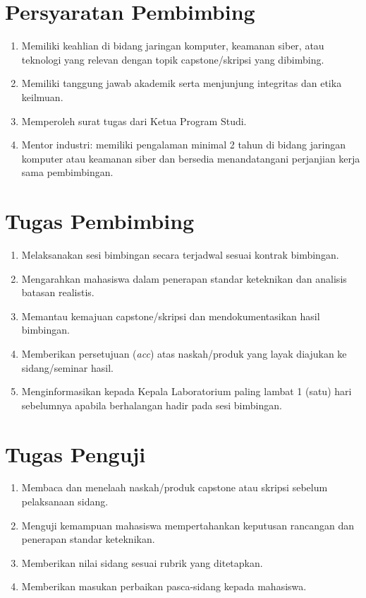 \documentclass[12pt,a4paper]{report}
\begin{document}
\section{Persyaratan Pembimbing}
\begin{enumerate}
\item Memiliki keahlian di bidang jaringan komputer, keamanan siber, atau teknologi yang relevan dengan topik capstone/skripsi yang dibimbing.
\item Memiliki tanggung jawab akademik serta menjunjung integritas dan etika keilmuan.
\item Memperoleh surat tugas dari Ketua Program Studi.
\item Mentor industri: memiliki pengalaman minimal 2 tahun di bidang jaringan komputer atau keamanan siber dan bersedia menandatangani perjanjian kerja sama pembimbingan.
\end{enumerate}

\section{Tugas Pembimbing}
\begin{enumerate}
\item Melaksanakan sesi bimbingan secara terjadwal sesuai kontrak bimbingan.
\item Mengarahkan mahasiswa dalam penerapan standar keteknikan dan analisis batasan realistis.
\item Memantau kemajuan capstone/skripsi dan mendokumentasikan hasil bimbingan.
\item Memberikan persetujuan (\emph{acc}) atas naskah/produk yang layak diajukan ke sidang/seminar hasil.
\item Menginformasikan kepada Kepala Laboratorium paling lambat 1 (satu) hari sebelumnya apabila berhalangan hadir pada sesi bimbingan.
\end{enumerate}

\section{Tugas Penguji}
\begin{enumerate}
\item Membaca dan menelaah naskah/produk capstone atau skripsi sebelum pelaksanaan sidang.
\item Menguji kemampuan mahasiswa mempertahankan keputusan rancangan dan penerapan standar keteknikan.
\item Memberikan nilai sidang sesuai rubrik yang ditetapkan.
\item Memberikan masukan perbaikan pasca-sidang kepada mahasiswa.
\end{enumerate}
\end{document}
